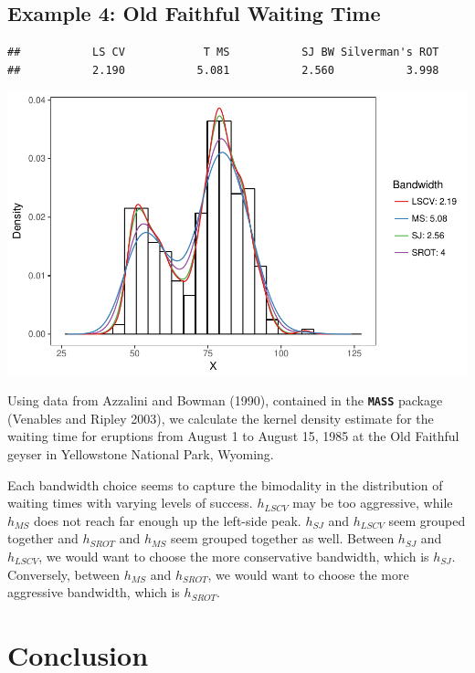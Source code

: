 \documentclass[]{article}
\begin{document}
\newpage

\subsection{Example 4: Old Faithful Waiting Time}

\begin{verbatim}
##           LS CV            T MS           SJ BW Silverman's ROT 
##           2.190           5.081           2.560           3.998
\end{verbatim}

\begin{center}\includegraphics{FinalReport_files/figure-latex/unnamed-chunk-9-1} \end{center}

Using data from Azzalini and Bowman (1990), contained in the
\textbf{\texttt{MASS}} package (Venables and Ripley 2003), we calculate
the kernel density estimate for the waiting time for eruptions from
August 1 to August 15, 1985 at the Old Faithful geyser in Yellowstone
National Park, Wyoming.

Each bandwidth choice seems to capture the bimodality in the
distribution of waiting times with varying levels of success.
\(h_{LSCV}\) may be too aggressive, while \(h_{MS}\) does not reach far
enough up the left-side peak. \(h_{SJ}\) and \(h_{LSCV}\) seem grouped
together and \(h_{SROT}\) and \(h_{MS}\) seem grouped together as well.
Between \(h_{SJ}\) and \(h_{LSCV}\), we would want to choose the more
conservative bandwidth, which is \(h_{SJ}\). Conversely, between
\(h_{MS}\) and \(h_{SROT}\), we would want to choose the more aggressive
bandwidth, which is \(h_{SROT}\).

\section{Conclusion}\label{conclusion}
\end{document}
